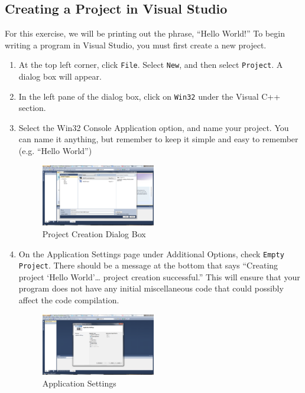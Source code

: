 \documentclass[twocolumn]{article}
\begin{document}
\subsection{Creating a Project in Visual Studio}	For this exercise, we will be printing out the phrase, “Hello World!” To begin writing a program in Visual Studio, you must first create a new project.
\begin{enumerate}
	\item At the top left corner, click \texttt{File}. Select \texttt{New}, and then select \texttt{Project}. A dialog box will appear.
	\item In the left pane of the dialog box, click on \texttt{Win32} under the Visual C++ section.
	\item Select the Win32 Console Application option, and name your project. You can name it anything, but remember to keep it simple and easy to remember (e.g. “Hello World”)
	\begin{figure}[htbp]
		\centering
		\includegraphics[width=0.47\textwidth]{1.png}
		\caption{Project Creation Dialog Box}
		\label{fig:projcreation}
	\end{figure}
	\item On the Application Settings page under Additional Options, check \texttt{Empty Project}. There should be a message at the bottom that says “Creating project ‘Hello World’… project creation successful.” This will ensure that your program does not have any initial miscellaneous code that could possibly affect the code compilation.
	\begin{figure}[htbp]
		\centering
		\includegraphics[width=0.47\textwidth]{2.png}
		\caption{Application Settings}
		\label{fig:appsettings}
	\end{figure}
\end{enumerate}
\end{document}
